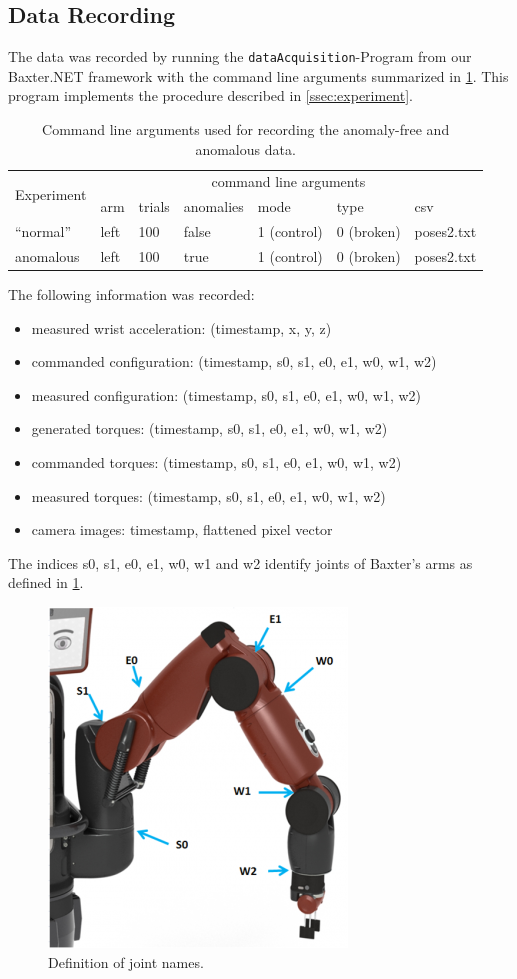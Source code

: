 \documentclass{scrartcl}
\newcommand{\baxterdotnet}{Baxter.NET\xspace}
\begin{document}
    \subsection{Data Recording}
        The data was recorded by running the \verb|dataAcquisition|-Program from our \baxterdotnet framework with the command line arguments summarized in \cref{tab:args}.
        This program implements the procedure described in \cref{ssec:experiment}.
        \begin{table}
            \centering
            \caption{Command line arguments used for recording the anomaly-free and anomalous data.}
            \label{tab:args}
            \begin{tabular}{lllllll}
                \toprule
                \multirow{2}{*}{Experiment} & \multicolumn{6}{c}{command line arguments} \\ \cline{2-7}
                & arm & trials & anomalies & mode & type & csv \\
                \midrule
                ``normal'' & left & 100 & false & 1 (control) & 0 (broken) & poses2.txt \\
                anomalous & left & 100 & true & 1 (control) & 0 (broken) & poses2.txt \\
                \bottomrule
            \end{tabular}
        \end{table}
        The following information was recorded:
        \begin{itemize}
            \item measured wrist acceleration: (timestamp, x, y, z)
            \item commanded configuration: (timestamp, s0, s1, e0, e1, w0, w1, w2)
            \item measured configuration: (timestamp, s0, s1, e0, e1, w0, w1, w2)
            \item generated torques: (timestamp, s0, s1, e0, e1, w0, w1, w2)
            \item commanded torques: (timestamp, s0, s1, e0, e1, w0, w1, w2)
            \item measured torques: (timestamp, s0, s1, e0, e1, w0, w1, w2)
            \item camera images: timestamp, flattened pixel vector
        \end{itemize}
        The indices s0, s1, e0, e1, w0, w1 and w2 identify joints of Baxter's arms as defined in \cref{fig:baxterjoints}.
        \begin{figure}
            \centering
            \includegraphics[width=.3\textwidth]{figs/baxterjoints}
            \caption{Definition of joint names.}
            \label{fig:baxterjoints}
        \end{figure}
\end{document}
